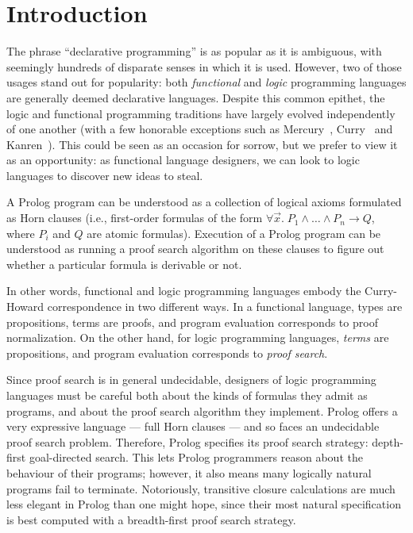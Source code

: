 \section{Introduction}

The phrase ``declarative programming'' is as popular as it is ambiguous, with
seemingly hundreds of disparate senses in which it is used. However, two of
those usages stand out for popularity: both \emph{functional} and \emph{logic}
programming languages are generally deemed declarative languages. Despite this
common epithet, the logic and functional programming traditions have largely
evolved independently of one another (with a few honorable exceptions such as
Mercury~\cite{mercury}, Curry~\cite{curry} and Kanren~\cite{kanren}). This could
be seen as an occasion for sorrow, but we prefer to view it as an opportunity:
as functional language designers, we can look to logic languages to discover new
ideas to steal.

A Prolog program can be understood as a collection of logical axioms formulated
as Horn clauses (i.e., first-order formulas of the form $\forall \vec{x}.\;P_1
\land \ldots \land P_n \to Q$, where $P_i$ and $Q$ are atomic formulas).
Execution of a Prolog program can be understood as running a proof search
algorithm on these clauses to figure out whether a particular formula is
derivable or not.

In other words, functional and logic programming languages embody the
Curry-Howard correspondence in two different ways. In a functional language,
types are propositions, terms are proofs, and program evaluation corresponds to
proof normalization. On the other hand, for logic programming languages,
\emph{terms} are propositions, and program evaluation corresponds to \emph{proof
  search}.

Since proof search is in general undecidable, designers of logic programming
languages must be careful both about the kinds of formulas they admit as
programs, and about the proof search algorithm they implement. Prolog offers a
very expressive language --- full Horn clauses --- and so faces an undecidable
proof search problem. Therefore, Prolog specifies its proof search strategy:
depth-first goal-directed search. This lets Prolog programmers reason about the
behaviour of their programs; however, it also means many logically natural
programs fail to terminate. Notoriously, transitive closure calculations are
much less elegant in Prolog than one might hope, since their most natural
specification is best computed with a breadth-first proof search strategy.

